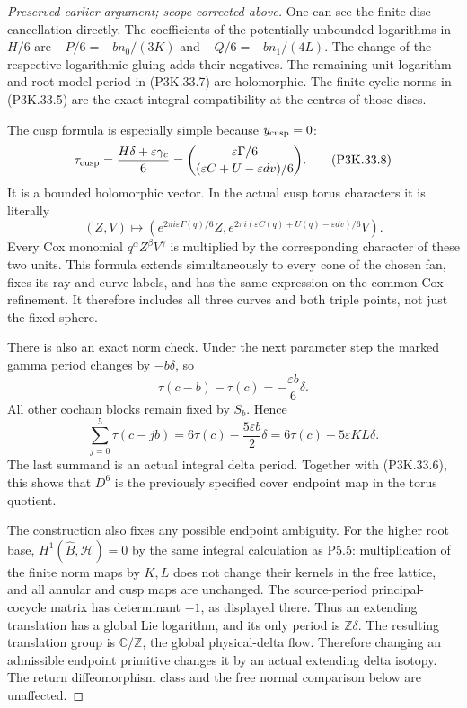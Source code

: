 \begin{proof}[Preserved earlier argument; scope corrected above]
One can see the finite-disc cancellation directly. The coefficients
of the potentially unbounded logarithms in \(H/6\) are
\(-P/6=-bn_0/(3K)\) and
\(-Q/6=-bn_1/(4L)\). The change of the respective logarithmic
gluing adds their negatives. The remaining unit logarithm and
root-model period in (P3K.33.7) are holomorphic. The finite cyclic
norms in (P3K.33.5) are the exact integral compatibility at the
centres of those discs.

The cusp formula is especially simple because \(y_{\rm cusp}=0\):
\[
 \tau_{\rm cusp}
     =\frac{H\delta+\varepsilon\gamma_c}{6}
     =\binom{\varepsilon\Gamma/6}
              {(\varepsilon C+U-\varepsilon dv)/6}.    \tag{P3K.33.8}
\]
It is a bounded holomorphic vector. In the actual cusp torus
characters it is literally
\[
 (Z,V)\longmapsto
 \left(e^{2\pi i\varepsilon\Gamma(q)/6}Z,
       e^{2\pi i(\varepsilon C(q)+U(q)-\varepsilon dv)/6}V\right).
                                                               \tag{P3K.33.9}
\]
Every Cox monomial \(q^\alpha Z^\beta V^\gamma\) is multiplied
by the corresponding character of these two units. This formula
extends simultaneously to every cone of the chosen fan, fixes
its ray and curve labels, and has the same expression on the
common Cox refinement. It therefore includes all three curves
and both triple points, not just the fixed sphere.

There is also an exact norm check. Under the next parameter
step the marked gamma period changes by \(-b\delta\), so
\[
 \tau(c-b)-\tau(c)=-\frac{\varepsilon b}{6}\delta.
\]
All other cochain blocks remain fixed by \(S_b\). Hence
\[
 \sum_{j=0}^5\tau(c-jb)=6\tau(c)-\frac{5\varepsilon b}{2}\delta
                      =6\tau(c)-5\varepsilon KL\delta. \tag{P3K.33.10}
\]
The last summand is an actual integral delta period. Together
with (P3K.33.6), this shows that \(D^6\) is the previously specified
cover endpoint map in the torus quotient.

The construction also fixes any possible endpoint ambiguity.
For the higher root base, \(H^1(\widehat B,\mathcal H)=0\)
by the same integral calculation as P5.5: multiplication of the
finite norm maps by \(K,L\) does not change their kernels in
the free lattice, and all annular and cusp maps are unchanged.
The source-period principal-cocycle matrix has determinant
\(-1\), as displayed there. Thus an extending translation has
a global Lie logarithm, and its only period is \(\mathbb Z\delta\).
The resulting translation group is \(\mathbb C/\mathbb Z\),
the global physical-delta flow. Therefore changing an admissible
endpoint primitive changes it by an actual extending delta
isotopy. The return diffeomorphism class and the free normal
comparison below are unaffected.


\end{proof}
